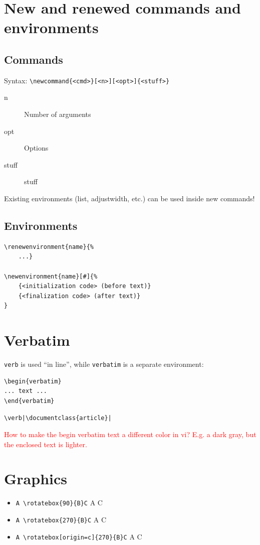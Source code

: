 \documentclass{article}
\begin{document}
\section{New and renewed commands and environments}
\subsection{Commands}
Syntax: \verb|\newcommand{<cmd>}[<n>][<opt>]{<stuff>}|
\begin{description}
    \item [n] Number of arguments
    \item [opt] Options
    \item [stuff] stuff
\end{description}
Existing environments (list, adjustwidth, etc.) can be used inside new
commands!

\subsection{Environments}
\begin{verbatim}
\renewenvironment{name}{%
    ...}

\newenvironment{name}[#]{%
    {<initialization code> (before text)}
    {<finalization code> (after text)}
}
\end{verbatim}


\section{Verbatim}
\texttt{verb} is used ``in line'', while \texttt{verbatim} is a separate
environment:
\begin{lstlisting}
\begin{verbatim}
... text ...
\end{verbatim}
\end{lstlisting}

\begin{verbatim}
\verb|\documentclass{article}|
\end{verbatim}
\textcolor{red}{How to make the begin verbatim text a different color
in vi? E.g. a dark gray, but the enclosed text is lighter.}

\section{Graphics}
\begin{minipage}{0.6\textwidth}
\begin{itemize}
    \item \verb|A \rotatebox{90}{B}C| \hfill A C
    \item \verb|A \rotatebox{270}{B}C| \hfill A C
    \item \verb|A \rotatebox[origin=c]{270}{B}C| \hfill A C
\end{itemize}
\end{minipage}
\end{document}
